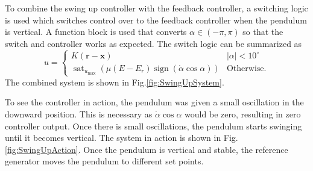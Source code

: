 \documentclass[superscriptaddress,floatfix,reprint,amssymb, amsmath,aps, pre]{revtex4-1}
\newcommand{\bx}{\textbf{x}}
\begin{document}
{{{            To combine the swing up controller with the feedback controller, a switching logic is used which switches control over to the feedback controller when the pendulum is vertical. A function block is used that converts \(\alpha \in (-\pi,\pi)\) so that the switch and controller works as expected. The switch logic can be summarized as 
            \begin{equation}
                u = \begin{cases}
                    K(\mathbf{r} - \bx) & |\alpha| < 10^\circ \\
                    \operatorname{sat}_{u_{\max }}\left(\mu\left(E-E_{r}\right) \operatorname{sign}(\dot{\alpha} \cos \alpha)\right) & \text{Otherwise}.
                \end{cases}
            \end{equation}
            The combined system is shown in Fig.\ref{fig:SwingUpSystem}.

            To see the controller in action, the pendulum was given a small oscillation in the downward position. This is necessary as \(\dot \alpha \cos \alpha\) would be zero, resulting in zero controller output. Once there is small oscillations, the pendulum starts swinging until it becomes vertical. The system in action is shown in Fig. \ref{fig:SwingUpAction}. Once the pendulum is vertical and stable, the reference generator moves the pendulum to different set points. 

}}}
\end{document}
